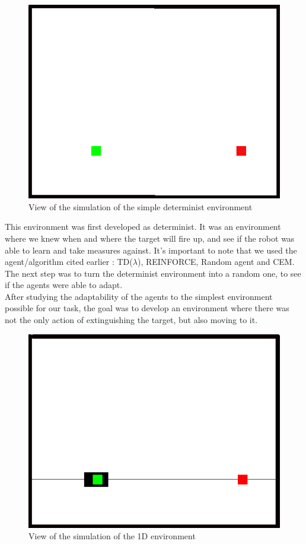 \documentclass[conference]{IEEEtran}
\begin{document}
\begin{figure}
  \includegraphics[scale = 0.4]{images/1Dultrasimple.png}
  \caption{View of the simulation of the simple determinist environment}
  \label{fig:my-figure}
\end{figure}

This environment was first developed as determinist. It was an environment where we knew when and where the target will fire up, and see if the robot was able to learn and take measures against.
It's important to note that we used the agent/algorithm cited earlier : TD($\lambda$), REINFORCE, Random agent and CEM.\\

The next step was to turn the determinist environment into a random one, to see if the agents were able to adapt.\\

After studying the adaptability of the agents to the simplest environment possible for our task, the goal was to develop an environment where there was not the only action of extinguishing the target, but also moving to it.\\

\begin{figure}
  \includegraphics[scale = 0.4]{images/1Dsimple.png}
  \caption{View of the simulation of the 1D environment}
  \label{fig:my-figure}
\end{figure}
\end{document}
